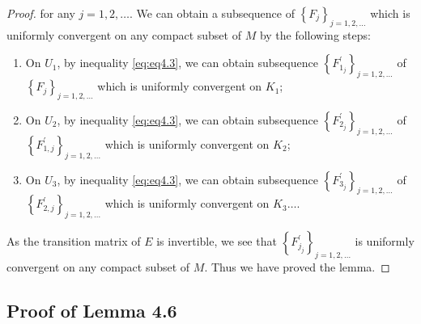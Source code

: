 \begin{proof}
for any $j=1,2, \ldots$.
We can obtain a subsequence of $\left\{F_j\right\}_{j=1,2, \ldots}$ which is uniformly convergent on any compact subset of $M$ by the following steps:
\begin{enumerate}[label=(\arabic*)]
  \item On $U_1$, by inequality \eqref{eq:eq4.3}, we can obtain subsequence $\left\{F_{1_j}^{\prime}\right\}_{j=1,2, \ldots}$ of $\left\{F_j\right\}_{j=1,2, \ldots}$ which is uniformly convergent on $K_1$;
  \item On $U_2$, by inequality \eqref{eq:eq4.3}, we can obtain subsequence $\left\{F_{2_j}^{\prime}\right\}_{j=1,2, \ldots}$ of $\left\{F_{1, j}^{\prime}\right\}_{j=1,2, \ldots}$ which is uniformly convergent on $K_2$;
  \item On $U_3$, by inequality \eqref{eq:eq4.3}, we can obtain subsequence $\left\{F_{3_j}^{\prime}\right\}_{j=1,2, \ldots}$ of $\left\{F_{2, j}^{\prime}\right\}_{j=1,2, \ldots}$ which is uniformly convergent on $K_3 \ldots$.
\end{enumerate}

As the transition matrix of $E$ is invertible, we see that $\left\{F_{j_j}^{\prime}\right\}_{j=1,2, \ldots}$ is uniformly convergent on any compact subset of $M$. Thus we have proved the lemma.
\end{proof}

\subsection{Proof of Lemma 4.6}

